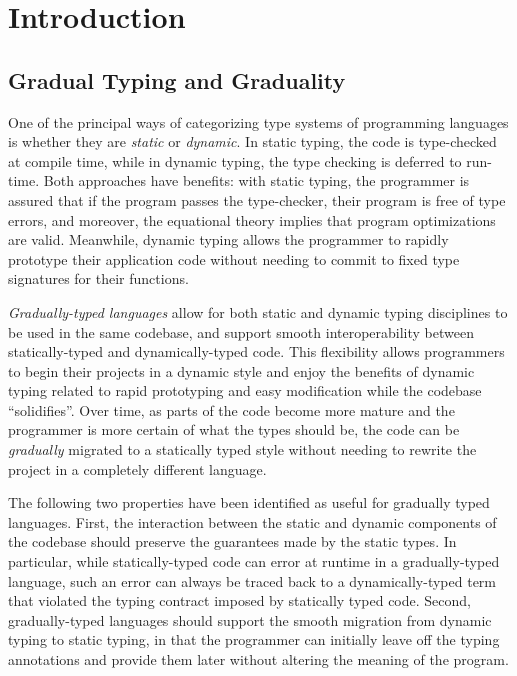 \section{Introduction}
  
\subsection{Gradual Typing and Graduality}
One of the principal ways of categorizing type systems of programming languages is
whether they are \emph{static} or \emph{dynamic}.
In static typing, the code is type-checked at compile time, while in dynamic typing,
the type checking is deferred to run-time. Both approaches have benefits: with static typing,
the programmer is assured that if the program passes the type-checker, their program
is free of type errors, and moreover, the equational theory implies that program optimizations are valid.
Meanwhile, dynamic typing allows the programmer to rapidly prototype
their application code without needing to commit to fixed type signatures for their functions.

\emph{Gradually-typed languages} \cite{siek-taha06, tobin-hochstadt06} allow
for both static and dynamic typing disciplines to be used in the same codebase,
and support smooth interoperability between statically-typed and dynamically-typed code.
This flexibility allows programmers to begin their projects in a dynamic style and
enjoy the benefits of dynamic typing related to rapid prototyping and easy modification
while the codebase ``solidifies''. Over time, as parts of the code become more mature
and the programmer is more certain of what the types should be, the code can be
\emph{gradually} migrated to a statically typed style without needing to
rewrite the project in a completely different language.

The following two properties have been identified as useful for gradually typed languages.
First, the interaction between the static and dynamic components of the codebase
should preserve the guarantees made by the static types.
In particular, while statically-typed code can error at runtime in a gradually-typed language,
such an error can always be traced back to a dynamically-typed term that
violated the typing contract imposed by statically typed code.
Second, gradually-typed languages should support the smooth migration from dynamic typing
to static typing, in that the programmer can initially leave off the
typing annotations and provide them later without altering the meaning of the
program.

